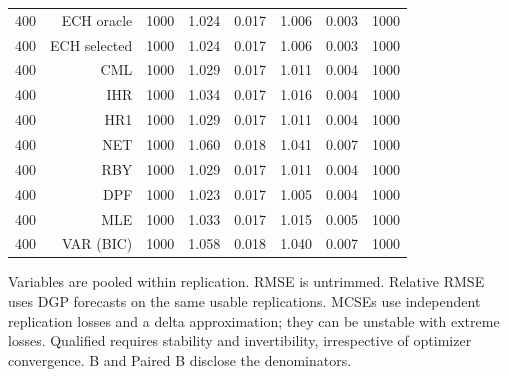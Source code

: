 \begin{table}[p]
\begin{tabular}{rrrrrrrr}
400 & ECH oracle & 1000 & 1.024 & 0.017 & 1.006 & 0.003 & 1000 \\
400 & ECH selected & 1000 & 1.024 & 0.017 & 1.006 & 0.003 & 1000 \\
400 & CML & 1000 & 1.029 & 0.017 & 1.011 & 0.004 & 1000 \\
400 & IHR & 1000 & 1.034 & 0.017 & 1.016 & 0.004 & 1000 \\
400 & HR1 & 1000 & 1.029 & 0.017 & 1.011 & 0.004 & 1000 \\
400 & NET & 1000 & 1.060 & 0.018 & 1.041 & 0.007 & 1000 \\
400 & RBY & 1000 & 1.029 & 0.017 & 1.011 & 0.004 & 1000 \\
400 & DPF & 1000 & 1.023 & 0.017 & 1.005 & 0.004 & 1000 \\
400 & MLE & 1000 & 1.033 & 0.017 & 1.015 & 0.005 & 1000 \\
400 & VAR (BIC) & 1000 & 1.058 & 0.018 & 1.040 & 0.007 & 1000 \\
\bottomrule\end{tabular}
\par\medskip
\begin{minipage}{0.98\linewidth}\footnotesize Variables are pooled within replication. RMSE is untrimmed. Relative RMSE uses DGP forecasts on the same usable replications. MCSEs use independent replication losses and a delta approximation; they can be unstable with extreme losses. Qualified requires stability and invertibility, irrespective of optimizer convergence. B and Paired B disclose the denominators.\end{minipage}
\end{table}
